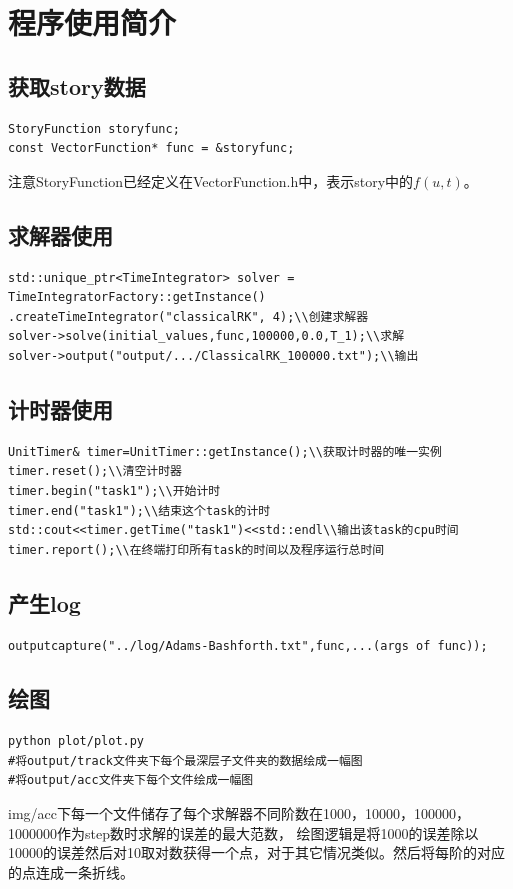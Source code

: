\section{程序使用简介}
\subsection{获取story数据}
\begin{verbatim}
StoryFunction storyfunc;
const VectorFunction* func = &storyfunc;
\end{verbatim}
注意StoryFunction已经定义在VectorFunction.h中，表示story中的$f(u,t)$。

\subsection{求解器使用}
\begin{verbatim}
std::unique_ptr<TimeIntegrator> solver = TimeIntegratorFactory::getInstance()
.createTimeIntegrator("classicalRK", 4);\\创建求解器
solver->solve(initial_values,func,100000,0.0,T_1);\\求解
solver->output("output/.../ClassicalRK_100000.txt");\\输出
\end{verbatim}

\subsection{计时器使用}

\begin{verbatim}
UnitTimer& timer=UnitTimer::getInstance();\\获取计时器的唯一实例
timer.reset();\\清空计时器
timer.begin("task1");\\开始计时
timer.end("task1");\\结束这个task的计时
std::cout<<timer.getTime("task1")<<std::endl\\输出该task的cpu时间
timer.report();\\在终端打印所有task的时间以及程序运行总时间
\end{verbatim}

\subsection{产生log}
\begin{verbatim}
outputcapture("../log/Adams-Bashforth.txt",func,...(args of func));
\end{verbatim}

\subsection{绘图}
\begin{verbatim}
python plot/plot.py 
#将output/track文件夹下每个最深层子文件夹的数据绘成一幅图
#将output/acc文件夹下每个文件绘成一幅图
\end{verbatim}

img/acc下每一个文件储存了每个求解器不同阶数在1000，10000，100000，1000000作为step数时求解的误差的最大范数，
绘图逻辑是将1000的误差除以10000的误差然后对10取对数获得一个点，对于其它情况类似。然后将每阶的对应的点连成一条折线。
